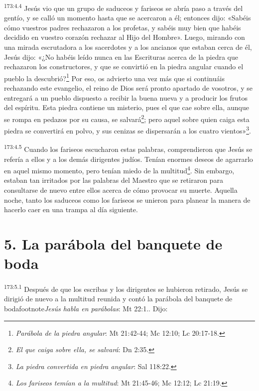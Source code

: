 \par 
\textsuperscript{173:4.4} Jesús vio que un grupo de saduceos y fariseos se abría paso a través del gentío, y se calló un momento hasta que se acercaron a él; entonces dijo: «Sabéis cómo vuestros padres rechazaron a los profetas, y sabéis muy bien que habéis decidido en vuestro corazón rechazar al Hijo del Hombre». Luego, mirando con una mirada escrutadora a los sacerdotes y a los ancianos que estaban cerca de él, Jesús dijo: «¿No habéis leído nunca en las Escrituras acerca de la piedra que rechazaron los constructores, y que se convirtió en la piedra angular cuando el pueblo la descubrió?\footnote{\textit{Parábola de la piedra angular}: Mt 21:42-44; Mc 12:10; Lc 20:17-18.} Por eso, os advierto una vez más que si continuáis rechazando este evangelio, el reino de Dios será pronto apartado de vosotros, y se entregará a un pueblo dispuesto a recibir la buena nueva y a producir los frutos del espíritu. Esta piedra contiene un misterio, pues el que cae sobre ella, aunque se rompa en pedazos por su causa, se salvará\footnote{\textit{El que caiga sobre ella, se salvará}: Dn 2:35.}; pero aquel sobre quien caiga esta piedra se convertirá en polvo, y sus cenizas se dispersarán a los cuatro vientos»\footnote{\textit{La piedra convertida en piedra angular}: Sal 118:22.}.

\par 
\textsuperscript{173:4.5} Cuando los fariseos escucharon estas palabras, comprendieron que Jesús se refería a ellos y a los demás dirigentes judíos. Tenían enormes deseos de agarrarlo en aquel mismo momento, pero tenían miedo de la multitud\footnote{\textit{Los fariseos temían a la multitud}: Mt 21:45-46; Mc 12:12; Lc 21:19.}. Sin embargo, estaban tan irritados por las palabras del Maestro que se retiraron para consultarse de nuevo entre ellos acerca de cómo provocar su muerte. Aquella noche, tanto los saduceos como los fariseos se unieron para planear la manera de hacerlo caer en una trampa al día siguiente.

\section*{5. La parábola del banquete de boda}
\par 
\textsuperscript{173:5.1} Después de que los escribas y los dirigentes se hubieron retirado, Jesús se dirigió de nuevo a la multitud reunida y contó la parábola del banquete de bodafootnote{\textit{Jesús habla en parábolas}: Mt 22:1.}. Dijo:

